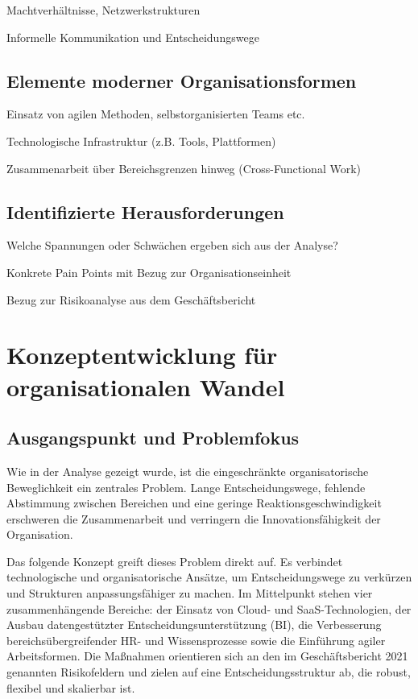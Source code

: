\documentclass[12pt,a4paper]{article}
\begin{document}
	Machtverhältnisse, Netzwerkstrukturen
	
	Informelle Kommunikation und Entscheidungswege
	\subsection{Elemente moderner Organisationsformen}
	Einsatz von agilen Methoden, selbstorganisierten Teams etc.
	
	Technologische Infrastruktur (z.B. Tools, Plattformen)
	
	Zusammenarbeit über Bereichsgrenzen hinweg (Cross-Functional Work)
	\subsection{Identifizierte Herausforderungen}
	
	Welche Spannungen oder Schwächen ergeben sich aus der Analyse?
	
	Konkrete Pain Points mit Bezug zur Organisationseinheit
	
	Bezug zur Risikoanalyse aus dem Geschäftsbericht
	
\section{Konzeptentwicklung für organisationalen Wandel}

\subsection{Ausgangspunkt und Problemfokus}

Wie in der Analyse gezeigt wurde, ist die eingeschränkte organisatorische Beweglichkeit ein zentrales Problem. Lange Entscheidungswege, fehlende Abstimmung zwischen Bereichen und eine geringe Reaktionsgeschwindigkeit erschweren die Zusammenarbeit und verringern die Innovationsfähigkeit der Organisation.

\noindent Das folgende Konzept greift dieses Problem direkt auf. Es verbindet technologische und organisatorische Ansätze, um Entscheidungswege zu verkürzen und Strukturen anpassungsfähiger zu machen. Im Mittelpunkt stehen vier zusammenhängende Bereiche: der Einsatz von Cloud- und SaaS-Technologien, der Ausbau datengestützter Entscheidungsunterstützung (BI), die Verbesserung bereichsübergreifender HR- und Wissensprozesse sowie die Einführung agiler Arbeitsformen. Die Maßnahmen orientieren sich an den im Geschäftsbericht 2021 genannten Risikofeldern und zielen auf eine Entscheidungsstruktur ab, die robust, flexibel und skalierbar ist.
\end{document}
